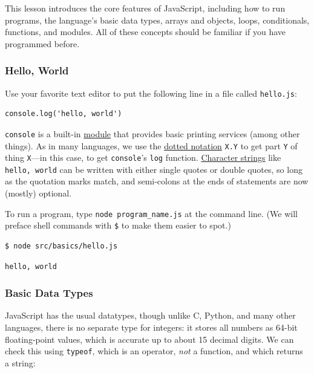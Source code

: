 This lesson introduces the core features of JavaScript, including how to
run programs, the language's basic data types, arrays and objects,
loops, conditionals, functions, and modules. All of these concepts
should be familiar if you have programmed before.

\subsubsection{Hello, World}\label{s:basics-hello-world}

Use your favorite text editor to put the following line in a file called
\texttt{hello.js}:

\begin{verbatim}
console.log('hello, world')
\end{verbatim}

\texttt{console} is a built-in \protect\hyperlink{g:module}{module} that
provides basic printing services (among other things). As in many
languages, we use the \protect\hyperlink{g:dotted-notation}{dotted
notation} \texttt{X.Y} to get part \texttt{Y} of thing \texttt{X}---in
this case, to get \texttt{console}'s \texttt{log} function.
\protect\hyperlink{g:string}{Character strings} like
\texttt{\textquotesingle{}hello,\ world\textquotesingle{}} can be
written with either single quotes or double quotes, so long as the
quotation marks match, and semi-colons at the ends of statements are now
(mostly) optional.

To run a program, type \texttt{node\ program\_name.js} at the command
line. (We will preface shell commands with \texttt{\$} to make them
easier to spot.)

\begin{verbatim}
$ node src/basics/hello.js
\end{verbatim}

\begin{verbatim}
hello, world
\end{verbatim}

\subsubsection{Basic Data Types}\label{s:basics-data-types}

JavaScript has the usual datatypes, though unlike C, Python, and many
other languages, there is no separate type for integers: it stores all
numbers as 64-bit floating-point values, which is accurate up to about
15 decimal digits. We can check this using \texttt{typeof}, which is an
operator, \emph{not} a function, and which returns a string:

